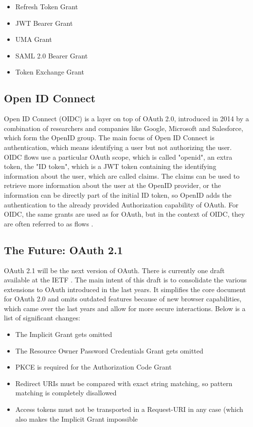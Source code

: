 \documentclass[
    fontsize=12pt,
    headings=small,
    parskip=half,           %
    bibliography=totoc,
    numbers=noenddot,       %
    open=any,               %
    ]{scrreprt}
\begin{document}
\begin{itemize}
	\item Refresh Token Grant
	\item JWT Bearer Grant
	\item UMA Grant
	\item SAML 2.0 Bearer Grant
	\item Token Exchange Grant
\end{itemize}

\subsection{Open ID Connect}
Open ID Connect (OIDC) is a layer on top of OAuth 2.0, introduced in 2014 by a combination of researchers and companies like Google, Microsoft and Salesforce, which form the OpenID group. The main focus of Open ID Connect is authentication, which means identifying a user but not authorizing the user. OIDC flows use a particular OAuth scope, which is called "openid", an extra token, the "ID token", which is a JWT token containing the identifying information about the user, which are called claims. The claims can be used to retrieve more information about the user at the OpenID provider, or the information can be directly part of the initial ID token, so OpenID adds the authentication to the already provided Authorization capability of OAuth. For OIDC, the same grants are used as for OAuth, but in the context of OIDC, they are often referred to as flows \cite{li2016analysing} \cite{sakimura2014openid}.

\subsection{The Future: OAuth 2.1}
OAuth 2.1 will be the next version of OAuth. There is currently one draft available at the IETF \cite{ietf-oauth-v2-1-09}. The main intent of this draft is to consolidate the various extensions to OAuth introduced in the last years. It simplifies the core document for OAuth 2.0 and omits outdated features because of new browser capabilities, which came over the last years and allow for more secure interactions. Below is a list of significant changes:
\begin{itemize}
	\item The Implicit Grant gets omitted
	\item The Resource Owner Password Credentials Grant gets omitted
	\item PKCE is required for the Authorization Code Grant
	\item Redirect URIs must be compared with exact string matching, so pattern matching is completely disallowed
	\item Access tokens must not be transported in a Request-URI in any case (which also makes the Implicit Grant impossible
\end{itemize}
\end{document}
